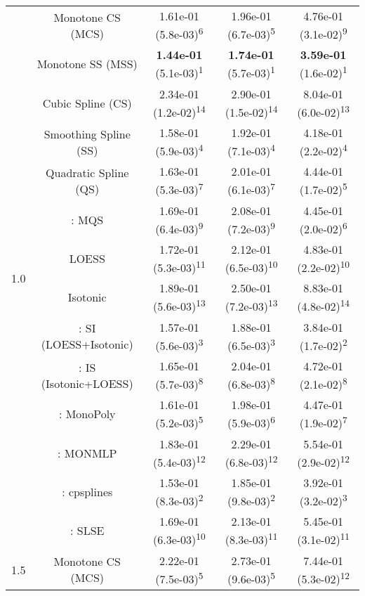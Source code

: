 \begin{tabular}{ccccc}
\midrule
\multirow{14}{*}{1.0}&Monotone CS (MCS)& 1.61e-01 (5.8e-03)\textsuperscript{6}& 1.96e-01 (6.7e-03)\textsuperscript{5}& 4.76e-01 (3.1e-02)\textsuperscript{9}\tabularnewline
&Monotone SS (MSS)& \textbf{1.44e-01} (5.1e-03)\textsuperscript{1}& \textbf{1.74e-01} (5.7e-03)\textsuperscript{1}& \textbf{3.59e-01} (1.6e-02)\textsuperscript{1}\tabularnewline
&Cubic Spline (CS)& 2.34e-01 (1.2e-02)\textsuperscript{14}& 2.90e-01 (1.5e-02)\textsuperscript{14}& 8.04e-01 (6.0e-02)\textsuperscript{13}\tabularnewline
&Smoothing Spline (SS)& 1.58e-01 (5.9e-03)\textsuperscript{4}& 1.92e-01 (7.1e-03)\textsuperscript{4}& 4.18e-01 (2.2e-02)\textsuperscript{4}\tabularnewline
&Quadratic Spline (QS)& 1.63e-01 (5.3e-03)\textsuperscript{7}& 2.01e-01 (6.1e-03)\textsuperscript{7}& 4.44e-01 (1.7e-02)\textsuperscript{5}\tabularnewline
&\textcite{heMonotoneBsplineSmoothing1998}: MQS& 1.69e-01 (6.4e-03)\textsuperscript{9}& 2.08e-01 (7.2e-03)\textsuperscript{9}& 4.45e-01 (2.0e-02)\textsuperscript{6}\tabularnewline
&LOESS& 1.72e-01 (5.3e-03)\textsuperscript{11}& 2.12e-01 (6.5e-03)\textsuperscript{10}& 4.83e-01 (2.2e-02)\textsuperscript{10}\tabularnewline
&Isotonic& 1.89e-01 (5.6e-03)\textsuperscript{13}& 2.50e-01 (7.2e-03)\textsuperscript{13}& 8.83e-01 (4.8e-02)\textsuperscript{14}\tabularnewline
&\textcite{mammenEstimatingSmoothMonotone1991}: SI (LOESS+Isotonic)& 1.57e-01 (5.6e-03)\textsuperscript{3}& 1.88e-01 (6.5e-03)\textsuperscript{3}& 3.84e-01 (1.7e-02)\textsuperscript{2}\tabularnewline
&\textcite{mammenEstimatingSmoothMonotone1991}: IS (Isotonic+LOESS)& 1.65e-01 (5.7e-03)\textsuperscript{8}& 2.04e-01 (6.8e-03)\textsuperscript{8}& 4.72e-01 (2.1e-02)\textsuperscript{8}\tabularnewline
&\textcite{murrayFastFlexibleMethods2016}: MonoPoly& 1.61e-01 (5.2e-03)\textsuperscript{5}& 1.98e-01 (5.9e-03)\textsuperscript{6}& 4.47e-01 (1.9e-02)\textsuperscript{7}\tabularnewline
&\textcite{cannonMonmlpMultilayerPerceptron2017}: MONMLP& 1.83e-01 (5.4e-03)\textsuperscript{12}& 2.29e-01 (6.8e-03)\textsuperscript{12}& 5.54e-01 (2.9e-02)\textsuperscript{12}\tabularnewline
&\textcite{navarro-garciaConstrainedSmoothingOutofrange2023}: cpsplines& 1.53e-01 (8.3e-03)\textsuperscript{2}& 1.85e-01 (9.8e-03)\textsuperscript{2}& 3.92e-01 (3.2e-02)\textsuperscript{3}\tabularnewline
&\textcite{groeneboomConfidenceIntervalsMonotone2023}: SLSE& 1.69e-01 (6.3e-03)\textsuperscript{10}& 2.13e-01 (8.3e-03)\textsuperscript{11}& 5.45e-01 (3.1e-02)\textsuperscript{11}\tabularnewline
\midrule
\multirow{14}{*}{1.5}&Monotone CS (MCS)& 2.22e-01 (7.5e-03)\textsuperscript{5}& 2.73e-01 (9.6e-03)\textsuperscript{5}& 7.44e-01 (5.3e-02)\textsuperscript{12}\tabularnewline

\end{tabular}
